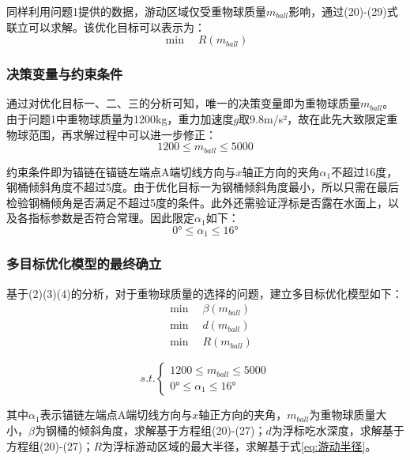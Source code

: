 \documentclass[withoutpreface,bwprint]{cumcmthesis}
\begin{document}
同样利用问题1提供的数据，游动区域仅受重物球质量$m_{ball}$影响，通过(20)-(29)式联立可以求解。该优化目标可以表示为：
\begin{equation}
\min \quad R(m_{ball})
\end{equation}

\subsubsection{决策变量与约束条件}
通过对优化目标一、二、三的分析可知，唯一的决策变量即为重物球质量$m_{ball}$。由于问题1中重物球质量为1200kg，重力加速度$g$取9.8m/s²，故在此先大致限定重物球范围，再求解过程中可以进一步修正：
\begin{equation}
1200 \leq m_{ball} \leq 5000
\end{equation}

约束条件即为锚链在锚链左端点A端切线方向与$x$轴正方向的夹角$\alpha_1$不超过16度，钢桶倾斜角度不超过5度。由于优化目标一为钢桶倾斜角度最小，所以只需在最后检验钢桶倾角是否满足不超过5度的条件。此外还需验证浮标是否露在水面上，以及各指标参数是否符合常理。因此限定$\alpha_1$如下：
\begin{equation}
0° \leq \alpha_1 \leq 16°
\end{equation}

\subsubsection{多目标优化模型的最终确立}
基于(2)(3)(4)的分析，对于重物球质量的选择的问题，建立多目标优化模型如下：
\begin{equation}
\label{eq:多目标}
\begin{aligned}
&\min \quad \beta(m_{ball}) \\
&\min \quad d(m_{ball}) \\
&\min \quad R(m_{ball})
\end{aligned}
\end{equation}

\begin{equation}
\label{eq:约束}
s.t. \begin{cases}
1200 \leq m_{ball} \leq 5000 \\
0° \leq \alpha_1 \leq 16°
\end{cases}
\end{equation}

其中$\alpha_1$表示锚链左端点A端切线方向与$x$轴正方向的夹角，$m_{ball}$为重物球质量大小，$\beta$为钢桶的倾斜角度，求解基于方程组(20)-(27)；$d$为浮标吃水深度，求解基于方程组(20)-(27)；$R$为浮标游动区域的最大半径，求解基于式\eqref{eq:游动半径}。
\end{document}
